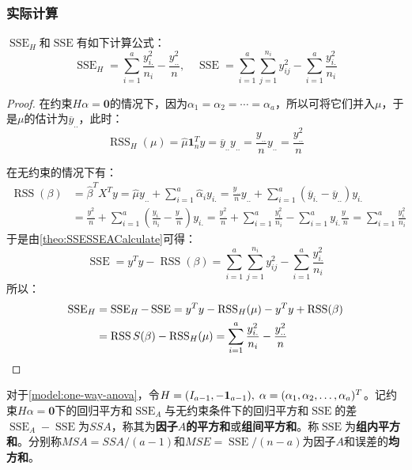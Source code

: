 \subsubsection{实际计算}
\begin{theorem}\label{theo:SSESSEACalculateAOV}
	$\operatorname{SSE}_H$和$\operatorname{SSE}$有如下计算公式：
	\begin{equation*}
		\operatorname{SSE}_H=\sum_{i=1}^{a}\frac{y_{i.}^2}{n_i}-\frac{y_{..}^2}{n},\quad \operatorname{SSE}=\sum_{i=1}^{a}\sum_{j=1}^{n_i}y_{ij}^2-\sum_{i=1}^{a}\frac{y_{i.}^2}{n_i}
	\end{equation*}
\end{theorem}
\begin{proof}
	在约束$H\alpha=\mathbf{0}$的情况下，因为$\alpha_1=\alpha_2=\cdots=\alpha_a$，所以可将它们并入$\mu$，于是$\mu$的估计为$\overline{y}_{..}$，此时：
	\begin{equation*}
		\operatorname{RSS}_H(\mu)=\hat{\mu}\mathbf{1}_n^Ty=\overline{y}_{..}y_{..}=\frac{y_{..}}{n}y_{..}=\frac{y_{..}^2}{n}
	\end{equation*}\par
	在无约束的情况下有：
	\begin{align*}
		\operatorname{RSS}(\beta)&=\hat{\beta}^TX^Ty=\hat{\mu}y_{..}+\sum_{i=1}^{a}\hat{\alpha}_iy_{i.} =\frac{y_{..}}{n}y_{..}+\sum_{i=1}^{a}(\overline{y}_{i.}-\overline{y}_{..})y_{i.} \\
		&=\frac{y_{..}^2}{n}+\sum_{i=1}^{a}\left(\frac{y_{i.}}{n_i}-\frac{y_{..}}{n}\right)y_{i.} =\frac{y_{..}^2}{n}+\sum_{i=1}^{a}\frac{y_{i.}^2}{n_i}-\sum_{i=1}^{a}y_{i.}\frac{y_{..}}{n}=\sum_{i=1}^{a}\frac{y_{i.}^2}{n_i}
	\end{align*}
	于是由\cref{theo:SSESSEACalculate}可得：
	\begin{equation*}
		\operatorname{SSE}=y^Ty-\operatorname{RSS}(\beta)=\sum_{i=1}^{a}\sum_{j=1}^{n_i}y_{ij}^2-\sum_{i=1}^{a}\frac{y_{i.}^2}{n_i}
	\end{equation*}
	所以：
	\begin{align*}
		\operatorname{SSE}_H&=\operatorname{SSE}_H-\operatorname{SSE}=y^Ty-\operatorname{RSS}_H(\mu)-y^Ty+\operatorname{RSS}(\beta) \\
		&=\operatorname{RSS}S(\beta)-\operatorname{RSS}_H(\mu)=\sum_{i=1}^{a}\frac{y_{i.}^2}{n_i}-\frac{y_{..}^2}{n}\qedhere
	\end{align*}
\end{proof}
\begin{definition}
	对于\cref{model:one-way-anova}，令$H=(I_{a-1},-\mathbf{1}_{a-1}),\;\alpha=(\alpha_1, \alpha_2, \dots, \alpha_{a})^T$。记约束$H\alpha=\mathbf{0}$下的回归平方和$\operatorname{SSE}_A$与无约束条件下的回归平方和$\operatorname{SSE}$的差$\operatorname{SSE}_A-\operatorname{SSE}$为$SSA$，称其为\textbf{因子$A$的平方和}或\textbf{组间平方和}。称$\operatorname{SSE}$为\textbf{组内平方和}。分别称$MSA=SSA/(a-1)$和$MSE=\operatorname{SSE}/(n-a)$为因子$A$和误差的\textbf{均方和}。
\end{definition}
